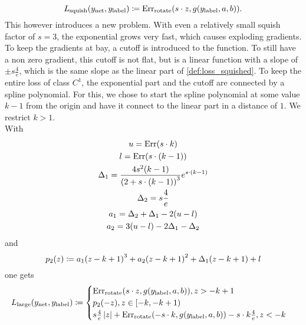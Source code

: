 \begin{equation}\label{def:loss_squished}
L_\text{squish}{\left( y_\text{net}, y_\text{label} \right)}\coloneqq \text{Err}_\text{rotate}{\left( s\cdot z, g(y_\text{label},a,b) \right)}.
\end{equation}
This however introduces a new problem. With even a relatively small squish factor of $s=3$, the exponential grows very fast, which causes exploding gradients. To keep the gradients at bay, a cutoff is introduced to the function. To still have a non zero gradient, this cutoff is not flat, but is a linear function with a slope of $\pm s\frac{4}{e}$, which is the same slope as the linear part of \eqref{def:loss_squished}. To keep the entire loss of class $C^1$, the exponential part and the cutoff are connected by a spline polynomial. For this, we chose to start the spline polynomial at some value $k-1$ from the origin and have it connect to the linear part in a distance of $1$. We restrict $k>1$.\\
With
\begin{gather}
u = \text{Err}{\left( s\cdot k \right)}\nonumber\\
l = \text{Err}{\left( s\cdot{\left( k-1 \right)} \right)}\nonumber\\
\Delta_1 = \frac{4 s^2 (k-1)}{{\left( 2+s\cdot (k-1) \right)}^3}e^{s\cdot (k-1)}\nonumber\\
\Delta_2 = s\frac{4}{e}\nonumber\\
a_1 = \Delta_2 + \Delta_1 - 2{\left( u-l \right)}\nonumber\\
a_2 = 3{\left( u-l \right)} - 2\Delta_1 - \Delta_2
\end{gather}
and
\begin{equation}
p_2(z)\coloneqq a_1 {\left( z-k+1 \right)}^3 + a_2{\left( z-k+1 \right)}^2 + \Delta_1 {\left( z-k+1 \right)} + l
\end{equation}
one gets
\begin{equation}
L_\text{large}{\left( y_\text{net}, y_\text{label} \right)}\coloneqq
\begin{cases}
	\text{Err}_\text{rotate}{\left( s\cdot z, g(y_\text{label},a,b) \right)}, z>-k+1\\
	p_2{\left( -z \right)}, z\in\left[-k, -k+1\right)\\
	s\frac{4}{e}\left|z\right|+\text{Err}_\text{rotate}{\left( -s\cdot k, g(y_\text{label},a,b) \right)}-s\cdot k\frac{4}{e}, z<-k\\
\end{cases}
\end{equation}
